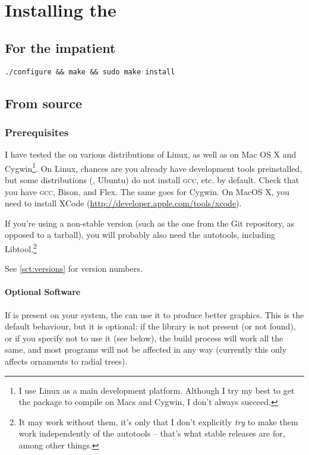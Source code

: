 \chapter{Installing the \nutils}
\label{app:installing}

\section{For the impatient}

\verb+./configure && make && sudo make install+

\section{From source}

\subsection{Prerequisites}

I have tested the \nutils{} on various distributions of Linux, as well as on Mac
OS X and Cygwin\footnote{I use Linux as a main development platform.  Although I
try my best to get the package to compile on Macs and Cygwin, I don't always
succeed.}. On Linux, chances are you already have development tools
preinstalled, but some distributions (\eg, Ubuntu) do not install \textsc{gcc},
etc. by default. Check that you have \textsc{gcc}, Bison, and Flex. The same
goes for Cygwin. On MacOS X, you need to install XCode
(\url{http://developer.apple.com/tools/xcode}).

If you're using a non-stable version (such as the one from the Git repository,
as opposed to a tarball), you will probably also need the \gnu{} autotools,
including Libtool.\footnote{It may work without them, it's only that I don't
explicitly \emph{try} to make them work independently of the autotools -- that's
what stable releases are for, among other things.}

See \ref{sct:versions} for version numbers.

\subsubsection{Optional Software}

\noindent{}If \libxml{} is present on your system, the \nutils{} can use it to
produce better \svg{} graphics. This is the default behaviour, but it is
optional: if the library is not present (or not found), or if you specify not to
use it (see below), the build process will work all the same, and most programs
will not be affected in any way (currently this only affects ornaments to
radial \svg{} trees).


